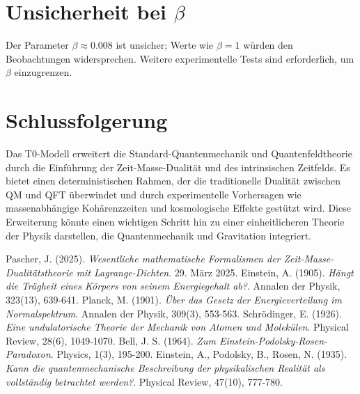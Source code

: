 \documentclass{article}
\begin{document}
	\section{Unsicherheit bei \(\beta\)}
	Der Parameter \( \beta \approx 0.008 \) ist unsicher; Werte wie \( \beta = 1 \) würden den Beobachtungen widersprechen. Weitere experimentelle Tests sind erforderlich, um \( \beta \) einzugrenzen.
	
	\section{Schlussfolgerung}
	Das T0-Modell erweitert die Standard-Quantenmechanik und Quantenfeldtheorie durch die Einführung der Zeit-Masse-Dualität und des intrinsischen Zeitfelds. Es bietet einen deterministischen Rahmen, der die traditionelle Dualität zwischen QM und QFT überwindet und durch experimentelle Vorhersagen wie massenabhängige Kohärenzzeiten und kosmologische Effekte gestützt wird. Diese Erweiterung könnte einen wichtigen Schritt hin zu einer einheitlicheren Theorie der Physik darstellen, die Quantenmechanik und Gravitation integriert.
	
	\begin{thebibliography}{99}
		 Pascher, J. (2025). \textit{Wesentliche mathematische Formalismen der Zeit-Masse-Dualitätstheorie mit Lagrange-Dichten}. 29. März 2025.
		 Einstein, A. (1905). \textit{Hängt die Trägheit eines Körpers von seinem Energiegehalt ab?}. Annalen der Physik, 323(13), 639-641.
		 Planck, M. (1901). \textit{Über das Gesetz der Energieverteilung im Normalspektrum}. Annalen der Physik, 309(3), 553-563.
		 Schrödinger, E. (1926). \textit{Eine undulatorische Theorie der Mechanik von Atomen und Molekülen}. Physical Review, 28(6), 1049-1070.
		 Bell, J. S. (1964). \textit{Zum Einstein-Podolsky-Rosen-Paradoxon}. Physics, 1(3), 195-200.
		 Einstein, A., Podolsky, B., Rosen, N. (1935). \textit{Kann die quantenmechanische Beschreibung der physikalischen Realität als vollständig betrachtet werden?}. Physical Review, 47(10), 777-780.
	\end{thebibliography}
	
\end{document}
